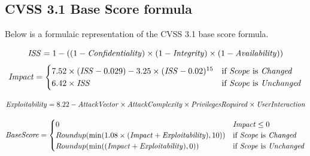 \documentclass[12pt]{article}
\begin{document}
\subsection{CVSS 3.1 Base Score formula} \label{equation}

Below is a formulaic representation of the CVSS 3.1 base score formula.
	{\scriptsize
		\begin{equation}
			\mathit{ISS} = 1 - ((1 - \mathit{Confidentiality}) \times (1 - \mathit{Integrity}) \times (1 - \mathit{Availability})) \\
		\end{equation}
		\begin{equation}
			\mathit{Impact} =
			\begin{cases}
				7.52 \times (\mathit{ISS} - 0.029) - 3.25 \times (\mathit{ISS} - 0.02)^{15} & \text{if \textit{Scope} is
				\textit{Changed}}                                                                                        \\
				6.42 \times \mathit{ISS}                                                    & \text{if \textit{Scope} is
					\textit{Unchanged}}
			\end{cases}
		\end{equation}

		\begin{equation}
			\mathit{Exploitability} = 8.22 - \mathit{AttackVector} \times \mathit{AttackComplexity} \times \mathit{PrivilegesRequired} \times
			\mathit{UserInteraction} \\
		\end{equation}

		\begin{equation}
			\mathit{BaseScore} =
			\begin{cases}
				0                                                                          & \mathit{Impact} \leq 0     \\
				Roundup(\min(1.08 \times (\mathit{Impact} + \mathit{Exploitability}), 10)) & \text{if \textit{Scope} is
				\textit{Changed}}                                                                                       \\
				Roundup(\min((\mathit{Impact} + \mathit{Exploitability}), 0))              & \text{if \textit{Scope} is
				\textit{Unchanged}}                                                                                     \\
			\end{cases}
		\end{equation}
	}
\end{document}
